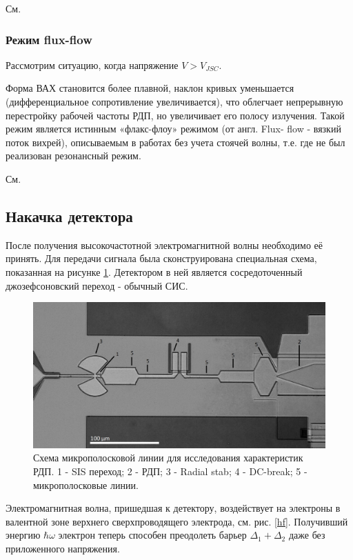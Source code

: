 \documentclass[12pt,a4paper]{article}
\begin{document}
См. \cite{Barychev}

\subsubsection{Режим flux-flow}

Рассмотрим ситуацию, когда напряжение  $V > V_{JSC}$. \par
Форма ВАХ становится более плавной, наклон кривых уменьшается (дифференциальное сопротивление увеличивается), что облегчает непрерывную перестройку рабочей частоты РДП, но увеличивает его полосу излучения. Такой режим является истинным «флакс-флоу» режимом (от англ. Flux- flow - вязкий поток вихрей), описываемым в работах без учета стоячей волны, т.е. где не был реализован резонансный режим.

См. \cite{Barychev}

\subsection{Накачка детектора}

После получения высокочастотной электромагнитной волны необходимо её принять. Для передачи сигнала была сконструирована специальная схема, показанная на рисунке \ref{cpl}. Детектором в ней является сосредоточенный джозефсоновский переход - обычный СИС.

\begin{figure}[H]
    \centering
    \includegraphics[scale = 0.8]{real-scheme.jpg}
    \caption{Схема микрополосковой линии для исследования характеристик РДП. 1 - SIS переход; 2 - РДП; 3 - Radial stab; 4 - DC-break; 5 - микрополосковые линии.}
    \label{cpl}
\end{figure}

Электромагнитная волна, пришедшая к детектору, воздействует на электроны в валентной зоне верхнего сверхпроводящего электрода, см. рис. \ref{hf}.
Получивший энергию {$\hbar \omega$} электрон теперь способен преодолеть барьер {$\Delta_1 + \Delta_2$} даже без приложенного напряжения.
\end{document}
